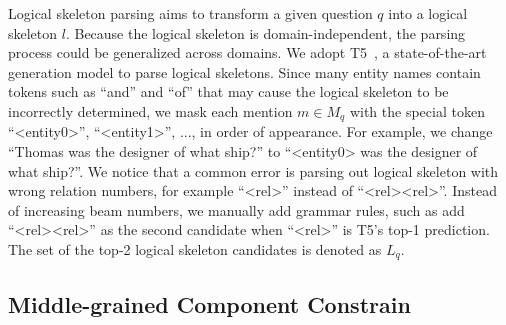
Logical skeleton parsing aims to transform a given question $q$ into a logical skeleton $l$. Because the logical skeleton is domain-independent, the parsing process could be generalized across domains. We adopt T5~\cite{raffel2020exploring}, a state-of-the-art generation model to parse logical skeletons. Since many entity names contain tokens such as ``and'' and
``of'' that may cause the logical skeleton to be incorrectly determined, we mask each mention $m \in M_q$ with the special token ``<entity0>'', ``<entity1>'', ..., in order of appearance. For example, we change ``Thomas was the designer of what ship?'' to ``<entity0> was the designer of what ship?''. We notice that a common error is parsing out logical skeleton with wrong relation numbers, for example ``<rel>'' instead of ``<rel><rel>''. Instead of increasing beam numbers, we manually add grammar rules, such as add ``<rel><rel>'' as the second candidate when ``<rel>'' is T5's top-1 prediction. The set of the top-2 logical skeleton candidates is denoted as $L_q$.




\subsection{Middle-grained Component Constrain}

